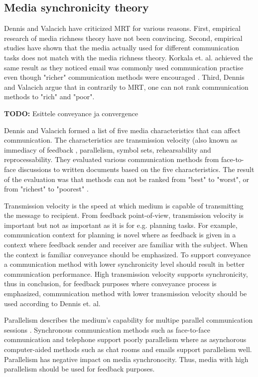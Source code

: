 \documentclass[conference]{IEEEtran}
\begin{document}
\subsection{Media synchronicity theory}

Dennis and Valacich have criticized MRT for various reasons. First, empirical research of media richness theory have not been convincing. Second, empirical studies have shown that the media actually used for different communication tasks does not match with the media richness theory. Korkala et. al. achieved the same result as they noticed email was commonly used communication practise even though "richer" communication methods were encouraged \cite{2006korkala}. Third, Dennis and Valacich argue that in contrarily to MRT, one can not rank communication methods to "rich" and "poor". \cite{1999dennis}

\textbf{TODO:} Esittele conveyance ja convergence

Dennis and Valacich formed a list of five media characteristics that can affect communication. The characteristics are transmission velocity (also known as immediacy of feedback \cite{1999dennis}, parallelism, symbol sets, rehearsability and reprocessability. They evaluated various communication methods from face-to-face discussions to written documents based on the five characteristics. The result of the evaluation was that methods can not be ranked from "best" to "worst", or from "richest" to "poorest" \cite{2008dennis}. 

Transmission velocity is the speed at which medium is capable of transmitting the message to recipient. From feedback point-of-view, transmission velocity is important but not as important as it is for e.g. planning tasks. For example, communication context for planning is novel where as feedback is given in a context where feedback sender and receiver are familiar with the subject. When the context is familiar conveyance should be emphasized. To support conveyance a communication method with lower synchronicity level should result in better communication performance. High transmission velocity supports synchronicity, thus in conclusion, for feedback purposes where conveyance process is emphasized, communication method with lower transmission velocity should be used according to Dennis et. al. \cite{2008dennis}

Parallelism describes the medium's capability for multipe parallel communication sessions \cite{2008dennis}. Synchronous communication methods such as face-to-face communication and telephone support poorly parallelism where as asynchorous computer-aided methods such as chat rooms and emails support parallelism well. Parallelism has negative impact on media synchronocity. Thus, media with high parallelism should be used for feedback purposes. \cite{2008dennis}
\end{document}
